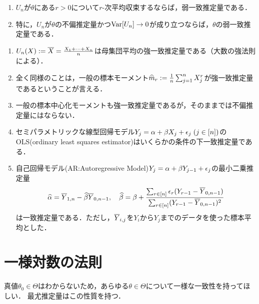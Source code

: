 \documentclass[uplatex,dvipdfmx]{jsreport}
\begin{document}
\begin{lemma}[確率収束の消息を統計の言葉で表現]\mbox{}
    \begin{enumerate}
        \item $U_n$が$\theta$にある$r>0$について$r$-次平均収束するならば，弱一致推定量である．
        \item 特に，$U_n$が$\theta$の不偏推定量かつ$\mathrm{Var}[U_n]\to0$が成り立つならば，$\theta$の弱一致推定量である．
    \end{enumerate}
\end{lemma}

\begin{example}[一致推定量]\mbox{}
    \begin{enumerate}
        \item $U_n(X):=\overline{X}=\frac{X_1+\cdots+X_n}{n}$は母集団平均の強一致推定量である（大数の強法則による）．
        \item 全く同様のことは，一般の標本モーメント$\widehat{m}_r:=\frac{1}{n}\sum^n_{j=1}X_j^r$が強一致推定量であるということが言える．
        \item 一般の標本中心化モーメントも強一致推定量であるが，そのままでは不偏推定量にはならない．
        \item セミパラメトリックな線型回帰モデル$Y_j=\alpha+\beta X_j+\epsilon_j\;(j\in[n])$のOLS(ordinary least squares estimator)はいくらかの条件の下一致推定量である．
        \item 自己回帰モデル(AR:Autoregressive Model)$Y_j=\alpha+\beta Y_{j-1}+\epsilon_j$の最小二乗推定量
        \[\widehat{\alpha}=\overline{Y}_{1,n}-\widehat{\beta}\overline{Y}_{0,n-1},\quad\widehat{\beta}=\beta+\frac{\sum_{r\in[n]}\epsilon_r(Y_{r-1}-\overline{Y}_{0,n-1})}{\sum_{r\in[n]}(Y_{r-1}-\overline{Y}_{0,n-1})^2}\]
        は一致推定量である．ただし，$\overline{Y}_{i,j}$を$Y_i$から$Y_j$までのデータを使った標本平均とした．
    \end{enumerate}
\end{example}

\section{一様対数の法則}

\begin{tcolorbox}[colframe=ForestGreen, colback=ForestGreen!10!white,breakable,colbacktitle=ForestGreen!40!white,coltitle=black,fonttitle=\bfseries\sffamily,
title=]
    真値$\theta_0\in\Theta$はわからないため，あらゆる$\theta\in\Theta$について一様な一致性を持ってほしい．
    最尤推定量はこの性質を持つ．
\end{tcolorbox}
\end{document}
